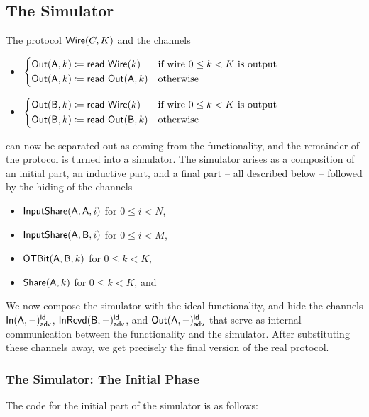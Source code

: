 \subsection{The Simulator}
The protocol $\mathsf{Wire}(C,K)$ and the channels
\begin{itemize}
\item $\begin{cases*} \Out(\A,k) \coloneqq \read{\Wire(k)} & \text{if wire $0 \leq k < K$ is output} \\ \Out(\A,k) \coloneqq \read{\Out(\A,k)} & \text{otherwise} \end{cases*}$
\item $\begin{cases*} \Out(\B,k) \coloneqq \read{\Wire(k)} & \text{if wire $0 \leq k < K$ is output} \\ \Out(\B,k) \coloneqq \read{\Out(\B,k)} & \text{otherwise} \end{cases*}$
\end{itemize}
can now be separated out as coming from the functionality, and the remainder of the protocol is turned into a simulator. The simulator arises as a composition of an initial part, an inductive part, and a final part -- all described below -- followed by the hiding of the channels \smallskip
\begin{itemize}
\item $\mathsf{InputShare}(\mathsf{A},\mathsf{A},i)$ for $0 \leq i < N$,
\item $\mathsf{InputShare}(\mathsf{A},\mathsf{B},i)$ for $0 \leq i < M$,
\item $\mathsf{OTBit}(\mathsf{A},\mathsf{B},k)$ for $0 \leq k < K$,
\item $\mathsf{Share}(\mathsf{A},k)$ for $0 \leq k < K$, and
\end{itemize}\smallskip
We now compose the simulator with the ideal functionality, and hide the channels $\mathsf{In}(\mathsf{A},-)^{\mathsf{id}}_{\mathsf{adv}}$, $\mathsf{InRcvd}(\mathsf{B},-)^{\mathsf{id}}_{\mathsf{adv}}$, and $\mathsf{Out}(\mathsf{A},-)^{\mathsf{id}}_{\mathsf{adv}}$ that serve as internal communication between the functionality and the simulator. After substituting these channels away, we get precisely the final version of the real protocol.

\subsubsection{The Simulator: The Initial Phase}
The code for the initial part of the simulator is as follows:

